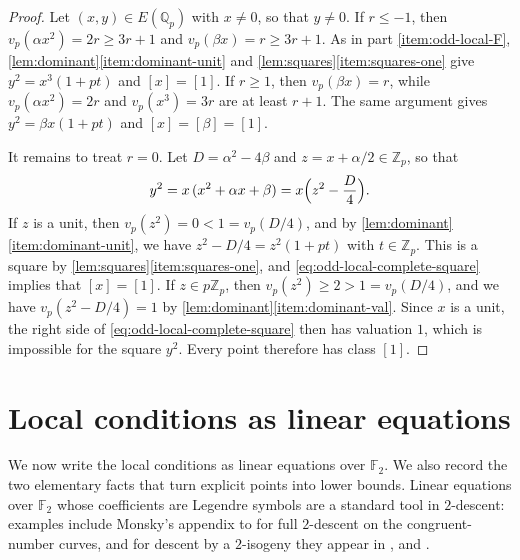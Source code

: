 \documentclass[12pt,oneside,openany]{book}
\theoremstyle{definition}
\theoremstyle{plain}
\numberwithin{equation}{chapter}
\theoremstyle{plain}
\theoremstyle{definition}
\theoremstyle{remark}
\newcommand{\Q}{\mathbb Q}
\newcommand{\Z}{\mathbb Z}
\newcommand{\F}{\mathbb F}
\newcommand{\sq}[1]{[#1]}
\begin{document}
\begin{proof}
Let $(x,y)\in E(\Q_p)$ with $x\ne0$, so that $y\ne0$. If $r\le-1$, then $v_p(\alpha x^2)=2r\ge3r+1$ and $v_p(\beta x)=r\ge3r+1$. As in part \ref{item:odd-local-F}, \cref{lem:dominant}\ref{item:dominant-unit} and \cref{lem:squares}\ref{item:squares-one} give $y^2=x^3(1+pt)$ and $\sq x=\sq1$. If $r\ge1$, then $v_p(\beta x)=r$, while $v_p(\alpha x^2)=2r$ and $v_p(x^3)=3r$ are at least $r+1$. The same argument gives $y^2=\beta x(1+pt)$ and $\sq x=\sq\beta=\sq1$.

It remains to treat $r=0$. Let $D=\alpha^2-4\beta$ and $z=x+\alpha/2\in\Z_p$, so that
\begin{equation}\label{eq:odd-local-complete-square}
y^2=x\,(x^2+\alpha x+\beta)=x\Bigl(z^2-\frac D4\Bigr).
\end{equation}
If $z$ is a unit, then $v_p(z^2)=0<1=v_p(D/4)$, and by \cref{lem:dominant}\ref{item:dominant-unit}, we have $z^2-D/4=z^2(1+pt)$ with $t\in\Z_p$. This is a square by \cref{lem:squares}\ref{item:squares-one}, and \eqref{eq:odd-local-complete-square} implies that $\sq x=\sq1$. If $z\in p\Z_p$, then $v_p(z^2)\ge2>1=v_p(D/4)$, and we have $v_p(z^2-D/4)=1$ by \cref{lem:dominant}\ref{item:dominant-val}. Since $x$ is a unit, the right side of \eqref{eq:odd-local-complete-square} then has valuation $1$, which is impossible for the square $y^2$. Every point therefore has class $\sq1$.
\end{proof}

\section{Local conditions as linear equations}\label{sec:descent-linear}

We now write the local conditions as linear equations over $\F_2$. We also record the two elementary facts that turn explicit points into lower bounds. Linear equations over $\F_2$ whose coefficients are Legendre symbols are a standard tool in $2$-descent: examples include Monsky's appendix to \cite[pp.~365--369, especially p.~366]{HeathBrownMonsky1994} for full $2$-descent on the congruent-number curves, and for descent by a $2$-isogeny they appear in \cite[Sections~2--3]{Feng1996}, \cite[Section~3.1, Theorem~3]{XiongZaharescu2009} and \cite[Section~4]{KaneKlagsbrun2017}.
\end{document}
